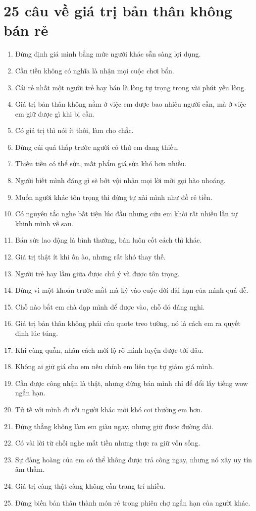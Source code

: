 \section{25 câu về giá trị bản thân không bán rẻ}
\begin{enumerate}[leftmargin=*,resume]
\item Đừng định giá mình bằng mức người khác sẵn sàng lợi dụng.
\item Cần tiền không có nghĩa là nhận mọi cuộc chơi bẩn.
\item Cái rẻ nhất một người trẻ hay bán là lòng tự trọng trong vài phút yếu lòng.
\item Giá trị bản thân không nằm ở việc em được bao nhiêu người cần, mà ở việc em giữ được gì khi bị cần.
\item Có giá trị thì nói ít thôi, làm cho chắc.
\item Đừng cúi quá thấp trước người có thứ em đang thiếu.
\item Thiếu tiền có thể sửa, mất phẩm giá sửa khó hơn nhiều.
\item Người biết mình đáng gì sẽ bớt vội nhận mọi lời mời gọi hào nhoáng.
\item Muốn người khác tôn trọng thì đừng tự xài mình như đồ rẻ tiền.
\item Có nguyên tắc nghe bất tiện lúc đầu nhưng cứu em khỏi rất nhiều lần tự khinh mình về sau.
\item Bán sức lao động là bình thường, bán luôn cốt cách thì khác.
\item Giá trị thật ít khi ồn ào, nhưng rất khó thay thế.
\item Người trẻ hay lầm giữa được chú ý và được tôn trọng.
\item Đừng vì một khoản trước mắt mà ký vào cuộc đời dài hạn của mình quá dễ.
\item Chỗ nào bắt em chà đạp mình để được vào, chỗ đó đáng nghi.
\item Giá trị bản thân không phải câu quote treo tường, nó là cách em ra quyết định lúc túng.
\item Khi cùng quẫn, nhân cách mới lộ rõ mình luyện được tới đâu.
\item Không ai giữ giá cho em nếu chính em liên tục tự giảm giá mình.
\item Cần được công nhận là thật, nhưng đừng bán mình chỉ để đổi lấy tiếng wow ngắn hạn.
\item Tử tế với mình đi rồi người khác mới khó coi thường em hơn.
\item Đứng thẳng không làm em giàu ngay, nhưng giữ được đường dài.
\item Có vài lời từ chối nghe mất tiền nhưng thực ra giữ vốn sống.
\item Sự đàng hoàng của em có thể không được trả công ngay, nhưng nó xây uy tín âm thầm.
\item Giá trị càng thật càng không cần trang trí nhiều.
\item Đừng biến bản thân thành món rẻ trong phiên chợ ngắn hạn của người khác.
\end{enumerate}

